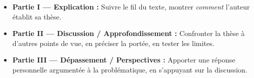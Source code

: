 \documentclass[11pt]{article}
\begin{document}
\begin{propriete}
\begin{itemize}
\item \textbf{Partie I — Explication :} Suivre le fil du texte, montrer \emph{comment} l'auteur établit sa thèse.
\item \textbf{Partie II — Discussion / Approfondissement :} Confronter la thèse à d'autres points de vue, en préciser la portée, en tester les limites.
\item \textbf{Partie III — Dépassement / Perspectives :} Apporter une réponse personnelle argumentée à la problématique, en s'appuyant sur la discussion.
\end{itemize}
\end{propriete}
\end{document}
